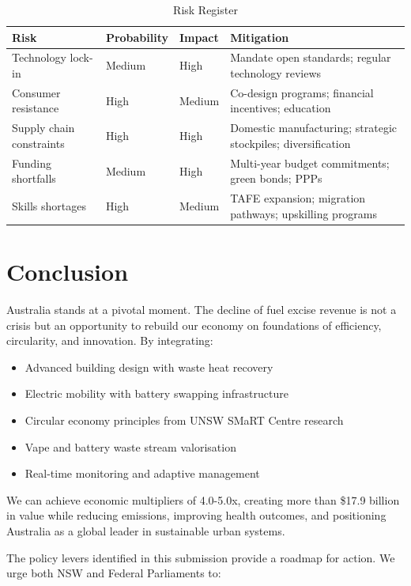 \documentclass[12pt,a4paper]{article}
\begin{document}
\begin{table}[h]
\centering
\caption{Risk Register}
\begin{tabular}{p{4cm}p{3cm}p{3cm}p{3cm}}
\toprule
\textbf{Risk} & \textbf{Probability} & \textbf{Impact} & \textbf{Mitigation} \\
\midrule
Technology lock-in & Medium & High & Mandate open standards; regular technology reviews \\
Consumer resistance & High & Medium & Co-design programs; financial incentives; education \\
Supply chain constraints & High & High & Domestic manufacturing; strategic stockpiles; diversification \\
Funding shortfalls & Medium & High & Multi-year budget commitments; green bonds; PPPs \\
Skills shortages & High & Medium & TAFE expansion; migration pathways; upskilling programs \\
\bottomrule
\end{tabular}
\end{table}

\section{Conclusion}

Australia stands at a pivotal moment. The decline of fuel excise revenue is not a crisis but an opportunity to rebuild our economy on foundations of efficiency, circularity, and innovation. By integrating:

\begin{itemize}
    \item Advanced building design with waste heat recovery
    \item Electric mobility with battery swapping infrastructure
    \item Circular economy principles from UNSW SMaRT Centre research
    \item Vape and battery waste stream valorisation
    \item Real-time monitoring and adaptive management
\end{itemize}

We can achieve economic multipliers of 4.0-5.0x, creating more than \$17.9 billion in value while reducing emissions, improving health outcomes, and positioning Australia as a global leader in sustainable urban systems.

The policy levers identified in this submission provide a roadmap for action. We urge both NSW and Federal Parliaments to:
\end{document}
